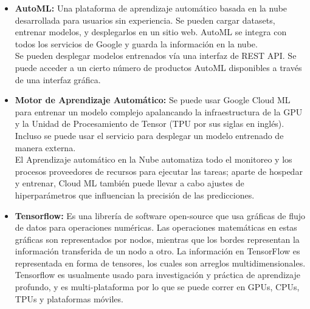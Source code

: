 \documentclass[12pt, a4paper, titlepage]{report}
\begin{document}
		\begin{itemize}
			\item \textbf{AutoML:} Una plataforma de aprendizaje automático basada en la nube desarrollada para usuarios sin experiencia. Se pueden cargar datasets, entrenar modelos, y desplegarlos en un sitio web. AutoML se integra con todos los servicios de Google y guarda la información en la nube.\\
			Se pueden desplegar modelos entrenados vía una interfaz de REST API. Se puede acceder a un cierto número de productos AutoML disponibles a través de una interfaz gráfica.
			\item \textbf{Motor de Aprendizaje Automático:} Se puede usar Google Cloud ML para entrenar un modelo complejo apalancando la infraestructura de la GPU y la Unidad de Procesamiento de Tensor (TPU por sus siglas en inglés). Incluso se puede usar el servicio para desplegar un modelo entrenado de manera externa.\\
			El Aprendizaje automático en la Nube automatiza todo el monitoreo y los procesos proveedores de recursos para ejecutar las tareas;  aparte de hospedar y entrenar, Cloud ML también puede llevar a cabo ajustes de hiperparámetros que influencian la precisión de las predicciones.
			\item \textbf{Tensorflow:} Es una librería de software open-source que usa gráficas de flujo de datos para operaciones numéricas. Las operaciones matemáticas en estas gráficas son representados por nodos, mientras que los bordes representan la información transferida de un nodo a otro. La información en TensorFlow es representada en forma de tensores, los cuales son arreglos multidimensionales.\\ Tensorflow es usualmente usado para investigación y práctica de aprendizaje profundo, y es multi-plataforma por lo que se puede correr en GPUs, CPUs, TPUs y plataformas móviles.
		\end{itemize}
		
\end{document}
